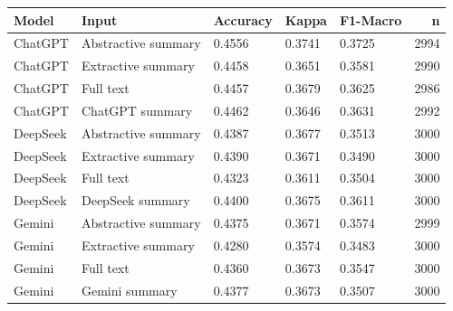 \begin{tabular}{lllllr}
\toprule
Model & Input & Accuracy & Kappa & F1-Macro & n \\
\midrule
ChatGPT & Abstractive summary & 0.4556 & 0.3741 & 0.3725 & 2994 \\
ChatGPT & Extractive summary & 0.4458 & 0.3651 & 0.3581 & 2990 \\
ChatGPT & Full text & 0.4457 & 0.3679 & 0.3625 & 2986 \\
ChatGPT & ChatGPT summary & 0.4462 & 0.3646 & 0.3631 & 2992 \\
DeepSeek & Abstractive summary & 0.4387 & 0.3677 & 0.3513 & 3000 \\
DeepSeek & Extractive summary & 0.4390 & 0.3671 & 0.3490 & 3000 \\
DeepSeek & Full text & 0.4323 & 0.3611 & 0.3504 & 3000 \\
DeepSeek & DeepSeek summary & 0.4400 & 0.3675 & 0.3611 & 3000 \\
Gemini & Abstractive summary & 0.4375 & 0.3671 & 0.3574 & 2999 \\
Gemini & Extractive summary & 0.4280 & 0.3574 & 0.3483 & 3000 \\
Gemini & Full text & 0.4360 & 0.3673 & 0.3547 & 3000 \\
Gemini & Gemini summary & 0.4377 & 0.3673 & 0.3507 & 3000 \\
\bottomrule
\end{tabular}
